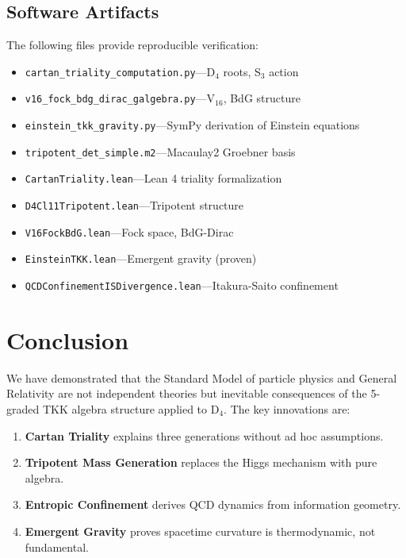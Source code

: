 \documentclass[12pt,a4paper]{article}
\theoremstyle{definition}
\theoremstyle{axiom}
\begin{document}
\subsection{Software Artifacts}

The following files provide reproducible verification:

\begin{itemize}
\item \texttt{cartan\_triality\_computation.py}---D$_4$ roots, S$_3$ action
\item \texttt{v16\_fock\_bdg\_dirac\_galgebra.py}---V$_{16}$, BdG structure
\item \texttt{einstein\_tkk\_gravity.py}---SymPy derivation of Einstein equations
\item \texttt{tripotent\_det\_simple.m2}---Macaulay2 Groebner basis
\item \texttt{CartanTriality.lean}---Lean 4 triality formalization
\item \texttt{D4Cl11Tripotent.lean}---Tripotent structure
\item \texttt{V16FockBdG.lean}---Fock space, BdG-Dirac
\item \texttt{EinsteinTKK.lean}---Emergent gravity (proven)
\item \texttt{QCDConfinementISDivergence.lean}---Itakura-Saito confinement
\end{itemize}

\newpage

\section{Conclusion}

We have demonstrated that the Standard Model of particle physics and General Relativity are not independent theories but inevitable consequences of the 5-graded TKK algebra structure applied to D$_4$. The key innovations are:

\begin{enumerate}
\item \textbf{Cartan Triality} explains three generations without ad hoc assumptions.
\item \textbf{Tripotent Mass Generation} replaces the Higgs mechanism with pure algebra.
\item \textbf{Entropic Confinement} derives QCD dynamics from information geometry.
\item \textbf{Emergent Gravity} proves spacetime curvature is thermodynamic, not fundamental.
\end{enumerate}
\end{document}
